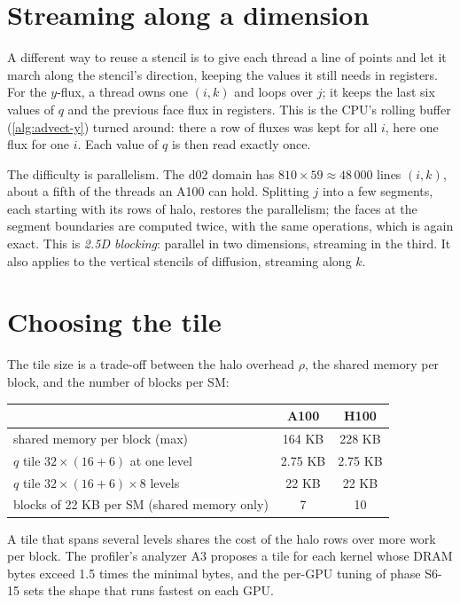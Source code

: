 \section{Streaming along a dimension}

A different way to reuse a stencil is to give each thread a line of points and let it march along the stencil's
direction, keeping the values it still needs in registers. For the $y$-flux, a thread owns one $(i,k)$ and loops over
$j$; it keeps the last six values of $q$ and the previous face flux in registers. This is the CPU's rolling buffer
(\cref{alg:advect-y}) turned around: there a row of fluxes was kept for all $i$, here one flux for one $i$. Each
value of $q$ is then read exactly once.

The difficulty is parallelism. The d02 domain has $810 \times 59 \approx 48\,000$ lines $(i,k)$, about a fifth of the
threads an A100 can hold. Splitting $j$ into a few segments, each starting with its rows of halo, restores the
parallelism; the faces at the segment boundaries are computed twice, with the same operations, which is again exact.
This is \emph{2.5D blocking}: parallel in two dimensions, streaming in the third. It also applies to the vertical
stencils of diffusion, streaming along $k$.

\section{Choosing the tile}

The tile size is a trade-off between the halo overhead $\rho$, the shared memory per block, and the number of blocks
per SM:
\begin{center}
\small
\begin{tabular}{lcc}
\toprule
 & A100 & H100 \\
\midrule
shared memory per block (max) & 164 KB & 228 KB \\
$q$ tile $32 \times (16 + 6)$ at one level & 2.75 KB & 2.75 KB \\
$q$ tile $32 \times (16 + 6) \times 8$ levels & 22 KB & 22 KB \\
blocks of 22 KB per SM (shared memory only) & 7 & 10 \\
\bottomrule
\end{tabular}
\end{center}
A tile that spans several levels shares the cost of the halo rows over more work per block. The profiler's analyzer A3
proposes a tile for each kernel whose DRAM bytes exceed 1.5 times the minimal bytes, and the per-GPU tuning of phase
S6-15 sets the shape that runs fastest on each GPU.

